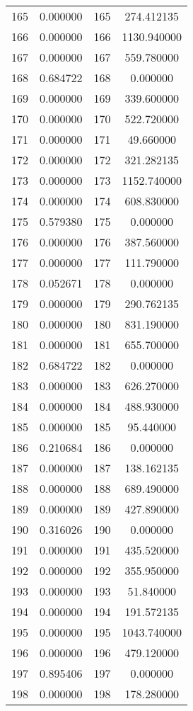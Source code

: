 \documentclass[12pt]{article}
\begin{document}
\begin{longtable}{@{}cccc@{}}
165 & 0.000000 & 165 & 274.412135 \\
166 & 0.000000 & 166 & 1130.940000 \\
167 & 0.000000 & 167 & 559.780000 \\
168 & 0.684722 & 168 & 0.000000 \\
169 & 0.000000 & 169 & 339.600000 \\
170 & 0.000000 & 170 & 522.720000 \\
171 & 0.000000 & 171 & 49.660000 \\
172 & 0.000000 & 172 & 321.282135 \\
173 & 0.000000 & 173 & 1152.740000 \\
174 & 0.000000 & 174 & 608.830000 \\
175 & 0.579380 & 175 & 0.000000 \\
176 & 0.000000 & 176 & 387.560000 \\
177 & 0.000000 & 177 & 111.790000 \\
178 & 0.052671 & 178 & 0.000000 \\
179 & 0.000000 & 179 & 290.762135 \\
180 & 0.000000 & 180 & 831.190000 \\
181 & 0.000000 & 181 & 655.700000 \\
182 & 0.684722 & 182 & 0.000000 \\
183 & 0.000000 & 183 & 626.270000 \\
184 & 0.000000 & 184 & 488.930000 \\
185 & 0.000000 & 185 & 95.440000 \\
186 & 0.210684 & 186 & 0.000000 \\
187 & 0.000000 & 187 & 138.162135 \\
188 & 0.000000 & 188 & 689.490000 \\
189 & 0.000000 & 189 & 427.890000 \\
190 & 0.316026 & 190 & 0.000000 \\
191 & 0.000000 & 191 & 435.520000 \\
192 & 0.000000 & 192 & 355.950000 \\
193 & 0.000000 & 193 & 51.840000 \\
194 & 0.000000 & 194 & 191.572135 \\
195 & 0.000000 & 195 & 1043.740000 \\
196 & 0.000000 & 196 & 479.120000 \\
197 & 0.895406 & 197 & 0.000000 \\
198 & 0.000000 & 198 & 178.280000 \\

\end{longtable}
\end{document}

